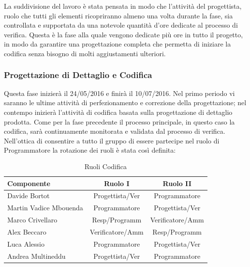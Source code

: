 \documentclass[a4paper,11pt]{article}
\begin{document}
		La suddivisione del lavoro è stata pensata in modo che l'attività del progettista, ruolo che tutti gli elementi ricopriranno almeno una volta durante la fase, sia controllata e supportata da una notevole quantità d'ore dedicate al processo di verifica. Questa è la fase alla quale vengono dedicate più ore in tutto il progetto, in modo da garantire una progettazione completa che permetta di iniziare la codifica senza bisogno di molti aggiustamenti ulteriori.
		\newpage
		\subsubsection{Progettazione di Dettaglio e Codifica}
		Questa fase inizierà il 24/05/2016 e finirà il 10/07/2016. Nel primo periodo vi saranno le ultime attività di perfezionamento e correzione della progettazione; nel contempo inizierà l'attività di codifica basata sulla progettazione di dettaglio prodotta. Come per la fase precedente il processo principale, in questo caso la codifica, sarà continuamente monitorata e validata dal processo di verifica. Nell'ottica di consentire a tutto il gruppo di essere partecipe nel ruolo di Programmatore la rotazione dei ruoli è stata così definita:
		\begin{table}[h!]			
		\begin{center}
			\begin{tabular}{l c c}
			\textbf{Componente} & \textbf{Ruolo I} & \textbf{Ruolo II} \\
			\midrule
			Davide Bortot & Progettista/Ver & Programmatore\\
			Martin Vadice Mbouenda & Programmatore & Progettista/Ver\\
			Marco Crivellaro & Resp/Programm & Verificatore/Amm\\
			Alex Beccaro & Verificatore/Amm & Resp/Programm\\
			Luca Alessio & Programmatore  & Progettista/Ver\\
			Andrea Multineddu & Progettista/Ver & Programmatore\\
			\midrule
			\end{tabular}
		\end{center}
		\caption{Ruoli Codifica}
		\end{table}
		
\end{document}
